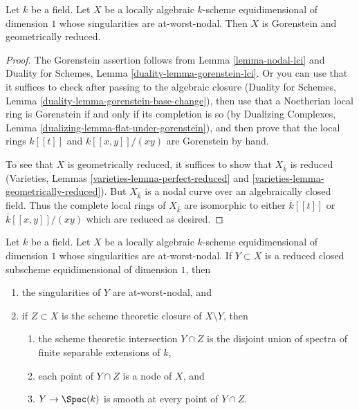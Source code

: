 \begin{lemma}
\label{lemma-facts-about-nodal-curves}
Let $k$ be a field. Let $X$ be a locally algebraic $k$-scheme
equidimensional of dimension $1$ whose singularities are at-worst-nodal.
Then $X$ is Gorenstein and geometrically reduced.
\end{lemma}

\begin{proof}
The Gorenstein assertion follows from Lemma \ref{lemma-nodal-lci}
and Duality for Schemes, Lemma \ref{duality-lemma-gorenstein-lci}.
Or you can use that it suffices to check after passing to the
algebraic closure (Duality for Schemes, Lemma
\ref{duality-lemma-gorenstein-base-change}), then use that
a Noetherian local ring is Gorenstein if and only if its
completion is so (by Dualizing Complexes, Lemma
\ref{dualizing-lemma-flat-under-gorenstein}), and
then prove that the local rings $k[[t]]$ and $k[[x, y]]/(xy)$
are Gorenstein by hand.

\medskip\noindent
To see that $X$ is geometrically reduced, it suffices to show that
$X_{\overline{k}}$ is reduced (Varieties, Lemmas
\ref{varieties-lemma-perfect-reduced} and
\ref{varieties-lemma-geometrically-reduced}).
But $X_{\overline{k}}$ is a nodal curve over an
algebraically closed field. Thus the complete local rings
of $X_{\overline{k}}$ are isomorphic to either
$\overline{k}[[t]]$ or $\overline{k}[[x, y]]/(xy)$
which are reduced as desired.
\end{proof}

\begin{lemma}
\label{lemma-closed-subscheme-nodal-curve}
Let $k$ be a field. Let $X$ be a locally algebraic $k$-scheme
equidimensional of dimension $1$ whose singularities are at-worst-nodal.
If $Y \subset X$ is a reduced closed subscheme
equidimensional of dimension $1$, then
\begin{enumerate}
\item the singularities of $Y$ are at-worst-nodal, and
\item if $Z \subset X$ is the scheme theoretic closure of
$X \setminus Y$, then
\begin{enumerate}
\item the scheme theoretic intersection $Y \cap Z$ is
the disjoint union of spectra of finite separable extensions of $k$,
\item each point of $Y \cap Z$ is a node of $X$, and
\item $Y \to \Spec(k)$ is smooth at every point of $Y \cap Z$.
\end{enumerate}
\end{enumerate}
\end{lemma}

